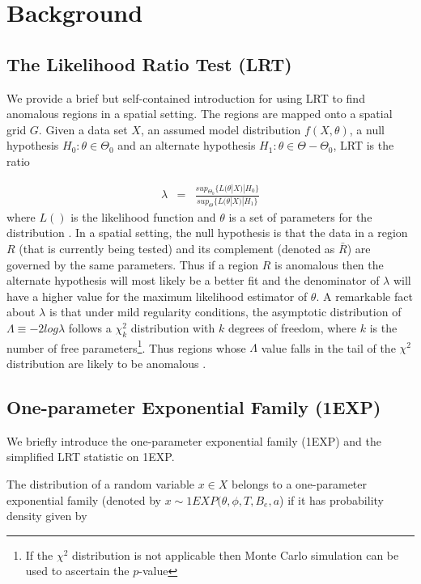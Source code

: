 \documentclass[AMA,LATO1COL]{WileyNJD-v2}
\begin{document}
\section{Background}\label{BG}

\subsection{The Likelihood Ratio Test (LRT)}
We provide a brief but self-contained introduction for using LRT
to find anomalous regions in a spatial setting. The regions are mapped onto a spatial grid $G$. Given a data set $X$, an assumed model distribution $f(X,\theta)$, a null hypothesis $H_{0}: \theta \in \Theta_0 $ and an alternate hypothesis $H_{1}: \theta \in {\Theta-\Theta_0}$, LRT is the ratio

\begin{eqnarray}\label{eq}
\lambda &=& \frac{ sup_{\Theta_0}\{L(\theta|X)|H_{0}\}}
{sup_{\Theta}\{L(\theta|X)|H_{1}\}}
\end{eqnarray}
\noindent where $L()$ is the likelihood function and  $\theta$ is a set of parameters
for the distribution \cite{jour}. In a spatial setting, the null hypothesis is that the data in a region $R$ (that is currently being tested) and
its complement (denoted as $\bar R$) are governed by the same
parameters. Thus if a region $R$ is anomalous then the alternate hypothesis will most likely be a better fit and the denominator of $\lambda$ will have a higher value for the maximum likelihood estimator of $\theta$.  A remarkable fact about $\lambda$ is that under mild regularity conditions, the asymptotic distribution of $\Lambda \equiv -2log\lambda$ follows a $ \chi ^{2}_{k}$ distribution with $k$ degrees of freedom, where
$k$ is the number of free parameters\footnote{If the $\chi^{2}$ distribution is not applicable then Monte Carlo simulation can be used to ascertain the $p$-value}. Thus regions whose $\Lambda$ value falls in the tail of the $\chi^{2}$ distribution are likely to be anomalous \cite{jour}.

\subsection{One-parameter Exponential Family (1EXP)}
We briefly introduce the one-parameter exponential family (1EXP) and the simplified LRT statistic on 1EXP.

 The distribution of a random variable $x\in X$ belongs to a one-parameter exponential family \cite{DagMaxmize} (denoted by $x\sim 1EXP(\theta,\phi,T,B_e,a$) if it has probability density given by
\end{document}
